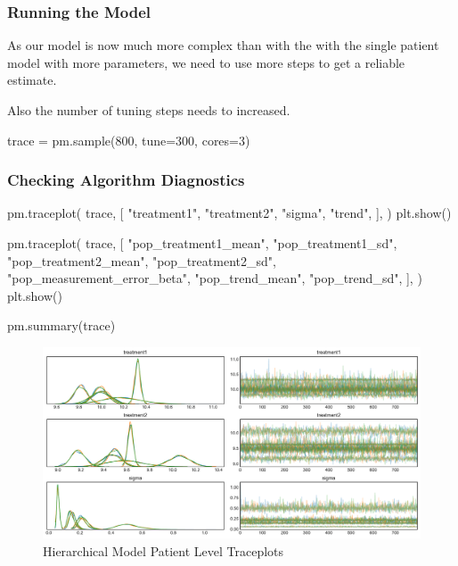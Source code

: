 \documentclass[12pt,a4paper,leqno]{report}
\theoremstyle{plain}
\theoremstyle{definition}
\theoremstyle{remark}
\begin{document}
\subsubsection{Running the Model}

As our model is now much more complex than with the with the single patient model with
more parameters, we need to use more steps to get a reliable estimate.

Also the number of tuning steps needs to increased.


\bigskip
\begin{pyverbatim}
    trace = pm.sample(800, tune=300, cores=3)
\end{pyverbatim}
\bigskip

\subsubsection{Checking Algorithm Diagnostics}
\bigskip
\begin{pyverbatim}
   pm.traceplot(
        trace,
        [
            "treatment1",
            "treatment2",
            "sigma",
            "trend",
        ],
   )
   plt.show()

   pm.traceplot(
        trace,
        [
            "pop_treatment1_mean",
            "pop_treatment1_sd",
            "pop_treatment2_mean",
            "pop_treatment2_sd",
            "pop_measurement_error_beta",
            "pop_trend_mean",
            "pop_trend_sd",
        ],
    )
    plt.show()

    pm.summary(trace)
\end{pyverbatim}
\bigskip

\begin{figure}[!h]
    \caption{Hierarchical Model Patient Level Traceplots}
    \includegraphics[width=\textwidth,height=\textheight,keepaspectratio]{hierarchical_model_patient_level_traceplot.pdf}
\end{figure}
\end{document}
